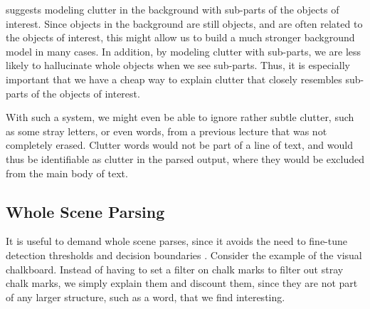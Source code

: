 \cite{jin-geman} suggests modeling clutter in the background with
sub-parts of the objects of interest. Since objects in the background
are still objects, and are often related to the objects of interest,
this might allow us to build a much stronger background model in many
cases. In addition, by modeling clutter with sub-parts, we are less
likely to hallucinate whole objects when we see sub-parts. Thus, it is
especially important that we have a cheap way to explain clutter that
closely resembles sub-parts of the objects of interest.

With such a system, we might even be able to ignore rather subtle
clutter, such as some stray letters, or even words, from a previous
lecture that was not completely erased. Clutter words would not be
part of a line of text, and would thus be identifiable as clutter in
the parsed output, where they would be excluded from the main body of
text.

\subsection{Whole Scene Parsing}
\label{sec-whole}

It is useful to demand whole scene parses, since it avoids the need to
fine-tune detection thresholds and decision boundaries
\cite{pop}. Consider the example of the visual chalkboard. Instead of
having to set a filter on chalk marks to filter out stray chalk marks,
we simply explain them and discount them, since they are not part of
any larger structure, such as a word, that we find interesting.

